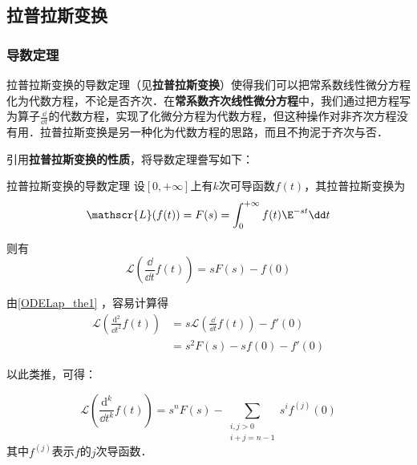 

\subsection{拉普拉斯变换}

\subsubsection{导数定理}

拉普拉斯变换的导数定理（见\textbf{拉普拉斯变换}）使得我们可以把常系数线性微分方程化为代数方程，不论是否齐次．在\textbf{常系数齐次线性微分方程}中，我们通过把方程写为算子$\frac{\dd }{\dd t}$的代数方程，实现了化微分方程为代数方程，但这种操作对非齐次方程没有用．拉普拉斯变换是另一种化为代数方程的思路，而且不拘泥于齐次与否．

引用\textbf{拉普拉斯变换的性质}，将导数定理誊写如下：
\begin{theorem}{拉普拉斯变换的导数定理}\label{ODELap_the1}
设$[0, +\infty]$上有$k$次可导函数$f(t)$，其拉普拉斯变换为
\begin{equation}
\mathscr{L}(f(t))=F(s)=\int^{+\infty}_0f(t)\E^{-st}\dd t
\end{equation}

则有
\begin{equation}
\mathscr{L}(\frac{\dd}{\dd t}f(t))=sF(s)-f(0)
\end{equation}
\end{theorem}

由\autoref{ODELap_the1} ，容易计算得
\begin{equation}
\begin{aligned}
\mathscr{L}(\frac{\mathrm{d}^2}{\dd t^2}f(t))&=s\mathscr{L}(\frac{\dd}{\dd t}f(t))-f'(0)\\
&=s^2F(s)-sf(0)-f'(0)
\end{aligned}
\end{equation}

以此类推，可得：

\begin{corollary}{}\label{ODELap_cor1}
\begin{equation}
\mathscr{L}(\frac{\mathrm{d}^k}{\dd t^k}f(t))=s^nF(s)-\sum_{\substack{i, j>0\\   i+j=n-1}}s^if^{(j)}(0)
\end{equation}
其中$f^{(j)}$表示$f$的$j$次导函数．



\end{corollary}





